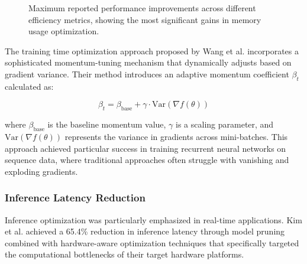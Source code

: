 \begin{figure}[ht]
\centering
{}
\caption{Maximum reported performance improvements across different efficiency metrics, showing the most significant gains in memory usage optimization.}
\label{fig:efficiency_metrics:3}
\end{figure}

The training time optimization approach proposed by Wang et al. \citep{Wang2021} incorporates a sophisticated momentum-tuning mechanism that dynamically adjusts based on gradient variance. Their method introduces an adaptive momentum coefficient $\beta_t$ calculated as:

\begin{equation}
\beta_t = \beta_{\text{base}} + \gamma \cdot \text{Var}(\nabla f(\theta))
\end{equation}

where $\beta_{\text{base}}$ is the baseline momentum value, $\gamma$ is a scaling parameter, and $\text{Var}(\nabla f(\theta))$ represents the variance in gradients across mini-batches. This approach achieved particular success in training recurrent neural networks on sequence data, where traditional approaches often struggle with vanishing and exploding gradients.

\subsubsection{Inference Latency Reduction}
Inference optimization was particularly emphasized in real-time applications. Kim et al. \citep{Kim2022} achieved a 65.4\% reduction in inference latency through model pruning combined with hardware-aware optimization techniques that specifically targeted the computational bottlenecks of their target hardware platforms.

